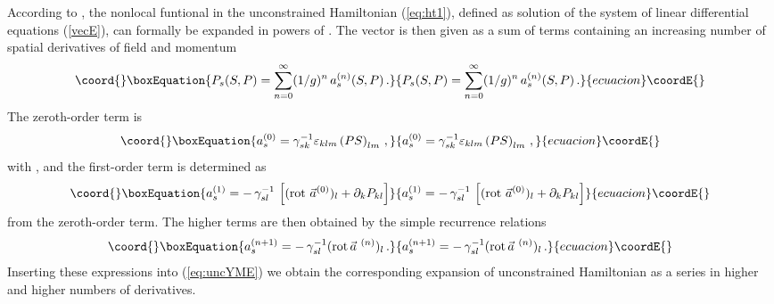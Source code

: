 \documentclass[a4paper,12pt]{article}
\begin{document}
According to \cite{KP}, the nonlocal funtional \coordHE{} in the
unconstrained Hamiltonian (\ref{eq:ht1}), defined as solution of the system of
linear differential equations (\ref{vecE}), can formally be expanded
in powers of \coordHE{}.
The vector \coordHE{} is then given as a sum of terms containing an increasing
number of spatial derivatives of field and momentum
\begin{equation}\coord{}\boxEquation{
\label{vecEmexp}
P_s (S, P) = \sum_{n=0}^{\infty}(1/g)^n\, a_s^{(n)}(S, P)\,.
}{
P_s (S, P) = \sum_{n=0}^{\infty}(1/g)^n\, a_s^{(n)}(S, P)\,.
}{ecuacion}\coordE{}\end{equation}
The zeroth-order term is
\begin{equation}\coord{}\boxEquation{
\label{vecE1}
a^{(0)}_{s} =
\gamma^{-1}_{sk}\varepsilon_{klm}\left(PS\right)_{lm}\,,
}{
a^{(0)}_{s} =
\gamma^{-1}_{sk}\varepsilon_{klm}\left(PS\right)_{lm}\,,
}{ecuacion}\coordE{}\end{equation}
with \coordHE{},
and the first-order term is determined as
\begin{equation}\coord{}\boxEquation{
\label{vecE2}
a^{(1)}_{s} = - \, \gamma^{-1}_{sl}\,
\left[
(\mbox{rot}\ \vec{a}^{(0)})_l + \partial_k P_{kl}
\right]
}{
a^{(1)}_{s} = - \, \gamma^{-1}_{sl}\,
\left[
(\mbox{rot}\ \vec{a}^{(0)})_l + \partial_k P_{kl}
\right]
}{ecuacion}\coordE{}\end{equation}
from the zeroth-order term.
The higher terms are then obtained by the simple recurrence relations
\begin{equation}\coord{}\boxEquation{ \label{vecE3}
a^{(n+1)}_{s} =
- \,\gamma^{-1}_{sl}(\mbox{rot}\, {\vec {a}}^{\ (n)})_l \,.
}{ a^{(n+1)}_{s} =
- \,\gamma^{-1}_{sl}(\mbox{rot}\, {\vec {a}}^{\ (n)})_l \,.
}{ecuacion}\coordE{}\end{equation}
Inserting these expressions into (\ref{eq:uncYME})
we obtain the corresponding expansion of unconstrained Hamiltonian as
a series in higher and higher numbers of derivatives.
\end{document}

